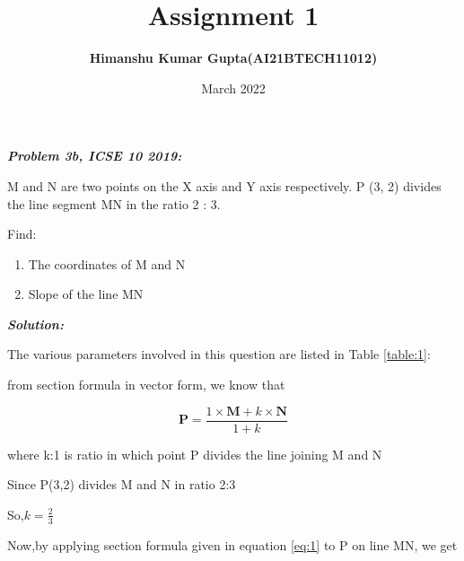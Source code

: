 \documentclass[journal,12pt,twocolumn]{IEEEtran}
\begin{document}
\newcommand{\myvec}[1]{\ensuremath{\begin{pmatrix}#1\end{pmatrix}}}

\let\vec\mathbf


\title{Assignment 1}
\author{\textbf{Himanshu Kumar Gupta(AI21BTECH11012)}}
\maketitle
\date {March 2022}


\textbf{\textit{Problem 3b, ICSE 10 2019:}}


 M and N are two points on the X axis and Y axis respectively. 
P (3, 2) divides the line segment MN in the ratio 2 : 3.

Find:
\begin{enumerate}
    \item The coordinates of M and N
    \item Slope of the line MN
\end{enumerate}

\textbf{\textit{Solution:}}

	The various parameters involved in this question are listed in Table \eqref{table:1}:
	\begin{table}[ht!]
		
		\vspace{10pt}
		\caption{}
		\label{table:1}	
	\end{table}

  from section formula in vector form, we know that
  
  \begin{equation}
  \label{eq:1}
\vec{P}=\frac{1\times \vec{M} +k\times \vec{N}}{1+k}     
  \end{equation}
 
  where k:1 is ratio in which point P divides the line joining M and N
  
Since P(3,2) divides M and N in ratio 2:3

So,$ k=\frac{2}{3}$

Now,by applying section formula given in equation \eqref{eq:1} to P on line MN, we get
\end{document}
